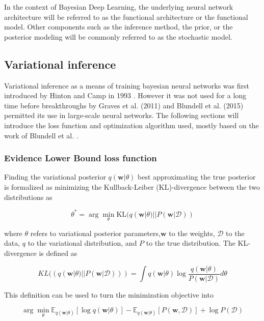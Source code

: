 	In the context of Bayesian Deep Learning, the underlying neural network architecture will be referred to as the functional architecture or the functional model. Other components such as the inference method, the prior,  or the posterior modeling will be commonly referred to as the stochastic model. 
	
	

\subsection{Variational inference}
\label{section:vi}


	Variational inference as a means of training bayesian neural networks was first introduced by Hinton and Camp in 1993 \cite{hinton_keeping_1993}. However it was not used for a long time before breakthroughs by Graves et al. (2011) \cite{graves_practical_2011} and Blundell et al. (2015) \cite{blundell_weight_2015} permitted its use in large-scale neural networks. The following sections will introduce the loss function and optimization algorithm used, mostly based on the work of Blundell et al. \cite{blundell_weight_2015}.
	
	\subsubsection*{Evidence Lower Bound loss function}
	Finding the variational posterior $q(\pmb{w}|\theta)$ best approximating the true posterior is formalized as minimizing the Kullback-Leiber (KL)-divergence between the two distributions as 
	
	\begin{equation}
		\label{eq:kl}
		\theta^* = \arg \min_{\theta} \text{KL}
		(
		q(\pmb{w}|\theta) 
		||
		P(\pmb{w}|\mathcal{D})
		)
	\end{equation}
	
	where $\theta$ refers to variational posterior parameters,$\pmb{w}$ to the weights, $\mathcal{D}$ to the data, $q$ to the variational distribution, and $P$ to the true distribution. The KL-divergence is defined as
	
	\begin{equation}
		KL((q(\pmb{w}|\theta) ||P(\pmb{w}|\mathcal{D}))) = \int q(\pmb{w}|\theta) \log \frac{q(\pmb{w}|\theta)}{P(\pmb{w}|\mathcal{D})} d\theta
	\end{equation}
	
	This definition can be used to turn the minimization objective into 
	
	\begin{equation}
		\arg \min_{\theta}
		\mathbb{E}_{q(\pmb{w}|\theta)}[\log q(\pmb{w}|\theta)] -
		\mathbb{E}_{q(\pmb{w}|\theta)}[P(\pmb{w},\mathcal{D})] + 
		\log P(\mathcal{D})
	\end{equation} 
	
